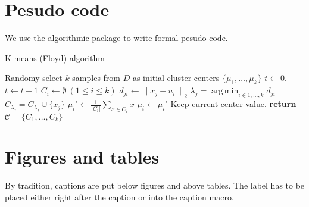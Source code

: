 \documentclass{article}
\DeclareMathOperator*{\argmin}{arg\,min}
\newcommand{\norm}[1]{\lVert#1{\rVert}}
\newcommand{\normtwo}[1]{{\norm{#1}}_2}
\begin{document}
\section{Pesudo code}
We use the algorithmic package to write formal pesudo code.
\begin{algorithm}
	\caption{K-means (Floyd) algorithm}
	\label{K-means}
	\begin{algorithmic}[1] %
		 
		\State Randomy select $k$ samples from $D$ as initial cluster centers $\{\mu_1,\ldots,\mu_k\}$
		\State $t \gets 0$.
		\Repeat					{}
		\State $t \gets t + 1$
		\State $C_i \gets \emptyset \ (1 \leq i \leq k)$
			\State $d_{ji} \gets \normtwo{x_j - u_i}$ 
			\State $\lambda_j = \argmin_{i \in {1,\ldots,k}} d_{ji}$ 
			\State $C_{\lambda_j} = C_{\lambda_j} \cup \{x_j\}$ 
		\EndFor
			\State $\mu_i' \gets \frac{1}{|C_i|} \sum_{x \in C_i} x$ 
				\State $\mu_i \gets \mu_i'$ 
			\Else
				\State Keep current center value.
			\EndIf
		\EndFor
		\State {}
		\State \textbf{return $\mathcal{C} = \{C_1,\ldots,C_k\}$} 
		\EndProcedure
	\end{algorithmic}
\end{algorithm}

\section{Figures and tables}
By tradition, captions are put below figures and above tables. The label has to be placed either right after the caption or into the caption macro.
\end{document}
